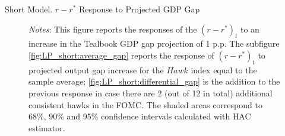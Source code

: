 \documentclass[10pt,aspectratio=169]{beamer}
\begin{document}
\begin{frame}{Short Model. $r-r^*$ Response to Projected GDP Gap}
\begin{figure}[!htbp]
\begin{minipage}{1\textwidth}
\begin{subfigure}[b]{0.495\textwidth}
          \end{subfigure}
              {\begin{flushleft}\tiny\textit{Notes}: This figure reports the responses of the $(r-r^*)_t$ to an increase in the Tealbook GDP gap projection of 1 p.p. The subfigure \ref{fig:LP_short:average_gap} reports the response of $(r-r^*)_t$ to projected output gap increase for the $\mathit{Hawk}$ index equal to the sample average; \ref{fig:LP_short:differential_gap} is the addition to the previous response in case there are 2 (out of 12 in total) additional consistent hawks in the FOMC. The shaded areas correspond to 68\%, 90\% and 95\% confidence intervals calculated with \cite{Andrews1991} HAC estimator.\end{flushleft}}
        \end{minipage}
      \end{figure}
\end{frame}
\end{document}
